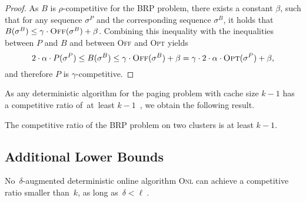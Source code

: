 \documentclass{siamart190516}
\newcommand{\ONL}{\textsc{Onl}\xspace}
\newcommand{\OFF}{\textsc{Off}\xspace}
\newcommand{\OPT}{\textsc{Opt}\xspace}
\begin{document}
\begin{proof}
As $B$ is $\rho$-competitive for the BRP problem, there exists a constant
$\beta$, such that for any sequence $\sigma^P$ and the corresponding sequence
$\sigma^B$, it holds that $B(\sigma^B) \leq \gamma \cdot \OFF(\sigma^B) +
\beta$. Combining this inequality with the inequalities between $P$ and $B$
and between \OFF and \OPT yields
\[
	2 \cdot \alpha \cdot P(\sigma^P) \leq 
	B(\sigma^B) \leq \gamma \cdot \OFF(\sigma^B) + \beta
	 =\gamma \cdot 2 \cdot \alpha \cdot \OPT(\sigma^P) + \beta,
\]
and therefore $P$ is $\gamma$-competitive.
\end{proof}

As any deterministic algorithm for the paging problem with cache size $k-1$
has a competitive ratio of~at~least $k-1$~\cite{SleTar85}, we obtain the
following result.

\begin{corollary}
The competitive ratio of the BRP problem on two clusters is at least $k-1$. 
\end{corollary}


\subsection{Additional Lower Bounds}
\label{sec:lower-bounds}

\begin{theorem}\label{thm:loweraugmk}
No~$\delta$-augmented deterministic online algorithm \ONL
can achieve a competitive ratio smaller than~$k$, as long as~$\delta < \ell~$.
\end{theorem}
\end{document}
